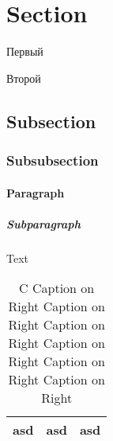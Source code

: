 \documentclass[a4paper,14pt]{extreport} %
\begin{document}
	\section{Section}
	
	Первый
	
	Второй
	
	\subsection{Subsection}
	
	\subsubsection{Subsubsection}
	
	\paragraph{Paragraph}
	
	\subparagraph{Subparagraph}
	
	Text
	\begin{table}[h]
		\captionsetup{width=0.95\linewidth}%
		\caption{C Caption on Right Caption on Right Caption on Right Caption on Right Caption on Right Caption on Right}%
		\begin{tabular}{|c|c|c|}
			\hline
			asd & asd & asd \\
			\hline
		\end{tabular}
	\end{table}

	\thetable
\end{document}
